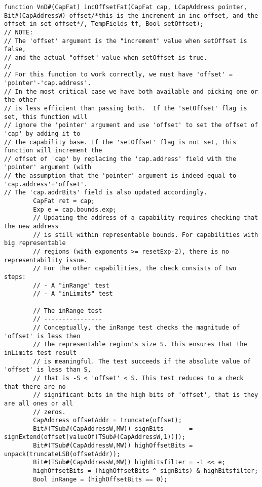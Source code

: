 \begin{lstlisting}[language=bluespec]
function VnD#(CapFat) incOffsetFat(CapFat cap, LCapAddress pointer, Bit#(CapAddressW) offset/*this is the increment in inc offset, and the offset in set offset*/, TempFields tf, Bool setOffset);
// NOTE:
// The 'offset' argument is the "increment" value when setOffset is false,
// and the actual "offset" value when setOffset is true.
//
// For this function to work correctly, we must have 'offset' = 'pointer'-'cap.address'.
// In the most critical case we have both available and picking one or the other
// is less efficient than passing both.  If the 'setOffset' flag is set, this function will
// ignore the 'pointer' argument and use 'offset' to set the offset of 'cap' by adding it to
// the capability base. If the 'setOffset' flag is not set, this function will increment the
// offset of 'cap' by replacing the 'cap.address' field with the 'pointer' argument (with
// the assumption that the 'pointer' argument is indeed equal to 'cap.address'+'offset'.
// The 'cap.addrBits' field is also updated accordingly.
        CapFat ret = cap;
        Exp e = cap.bounds.exp;
        // Updating the address of a capability requires checking that the new address
        // is still within representable bounds. For capabilities with big representable
        // regions (with exponents >= resetExp-2), there is no representability issue.
        // For the other capabilities, the check consists of two steps:
        // - A "inRange" test
        // - A "inLimits" test

        // The inRange test
        // ----------------
        // Conceptually, the inRange test checks the magnitude of 'offset' is less then
        // the representable region's size S. This ensures that the inLimits test result
        // is meaningful. The test succeeds if the absolute value of 'offset' is less than S,
        // that is -S < 'offset' < S. This test reduces to a check that there are no
        // significant bits in the high bits of 'offset', that is they are all ones or all
        // zeros.
        CapAddress offsetAddr = truncate(offset);
        Bit#(TSub#(CapAddressW,MW)) signBits       = signExtend(offset[valueOf(TSub#(CapAddressW,1))]);
        Bit#(TSub#(CapAddressW,MW)) highOffsetBits = unpack(truncateLSB(offsetAddr));
        Bit#(TSub#(CapAddressW,MW)) highBitsfilter = -1 << e;
        highOffsetBits = (highOffsetBits ^ signBits) & highBitsfilter;
        Bool inRange = (highOffsetBits == 0);


\end{lstlisting}
